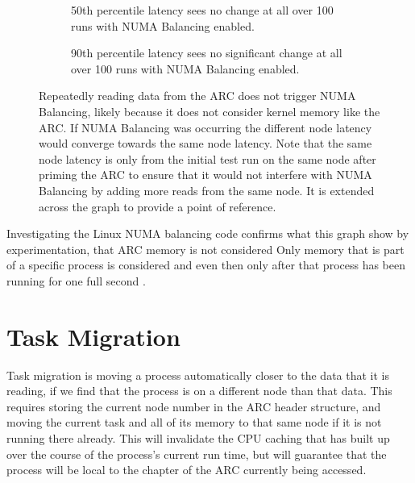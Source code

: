 \begin{figure}[H]
    \centering
    \begin{subfigure}{0.4\linewidth}
        \resizebox{0.9\linewidth}{!}{}
        \captionsetup{width=0.9\textwidth}
        \caption{50th percentile latency sees no change at all over 100 runs with NUMA Balancing enabled.}
    \end{subfigure}
    \begin{subfigure}{0.4\linewidth}
        \resizebox{0.9\linewidth}{!}{}
        \captionsetup{width=0.9\textwidth}
        \caption{90th percentile latency sees no significant change at all over 100 runs with NUMA Balancing enabled.}
    \end{subfigure}
    \captionsetup{width=0.80\linewidth}
    \caption{Repeatedly reading data from the ARC does not trigger NUMA Balancing, likely because it does not consider kernel memory like the ARC.
    If NUMA Balancing was occurring the different node latency would converge towards the same
    node latency. Note that the same node latency is only from the initial test run on the same node
    after priming the ARC to ensure that it would not interfere with NUMA Balancing by adding more
    reads from the same node. It is extended across the graph to provide a point of reference.}
    \label{fig:100NUMABalance}
\end{figure}

Investigating the Linux NUMA balancing code confirms what this graph show by experimentation, that ARC memory is not considered
Only memory that is part of a specific process is considered and even then only after that process has been running for one full second
\cite[{kernel/sched/fair.c}]{linux}.

\chapter{Task Migration}
Task migration is moving a process automatically closer to the data that it is reading, if we find that the process is on a different node than that data.
This requires storing the current node number in the ARC header structure, 
and moving the current task and all of its memory to that same node if it is not running there already.
This will invalidate the CPU caching that has built up over the course of the process's current run time,
but will guarantee that the process will be local to the chapter of the ARC currently being accessed.


